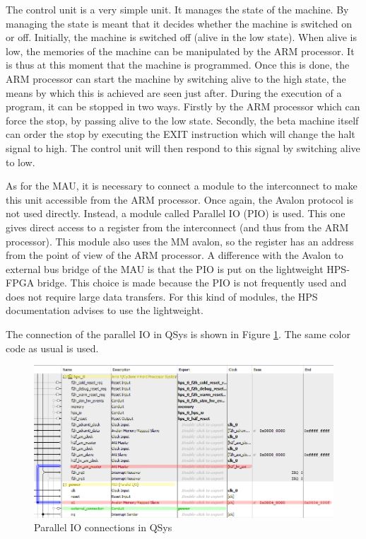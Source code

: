 The control unit is a very simple unit. It manages the state of the machine. By managing the state is meant that 
it decides whether the machine is switched on or off. Initially, the machine is switched off (alive 
in the low state). When alive is low, the memories of the machine can be manipulated by the ARM 
processor. It is thus at this moment that the machine is programmed. Once this is done, the ARM 
processor can start the machine by switching alive to the high state, the means by which this is 
achieved are seen just after. During the execution of a program, it can be stopped in two ways. 
Firstly by the ARM processor which can force the stop, by passing alive to the low state. Secondly, 
the beta machine itself can order the stop by executing the EXIT instruction which will change the 
halt signal to high. The control unit will then respond to this signal by switching alive to low.

As for the MAU, it is necessary to connect a module to the interconnect to make this unit 
accessible from the ARM processor. Once again, the Avalon protocol is not used directly. 
Instead, a module called Parallel IO (PIO) is used. This one gives direct access to a register 
from the interconnect (and thus from the ARM processor). This module also uses the MM avalon, so 
the register has an address from the point of view of the ARM processor. A difference with 
the Avalon to external bus bridge of the MAU is that the PIO is put on the lightweight HPS-FPGA 
bridge. This choice is made because the PIO is not frequently used and does not require large data 
transfers. For this kind of modules, the HPS documentation advises to use the lightweight.

The connection of the parallel IO in QSys is shown in Figure \ref{fig:qsys/ctrlu}. The same color 
code as usual is used.

\begin{figure}[ht!]
    \center
    \includegraphics[width=\linewidth]{"Chapter6-MAU_CTRLU/res/qsys_ctrlu.PNG"}
    \caption{Parallel IO connections in QSys}
    \label{fig:qsys/ctrlu}
\end{figure}

